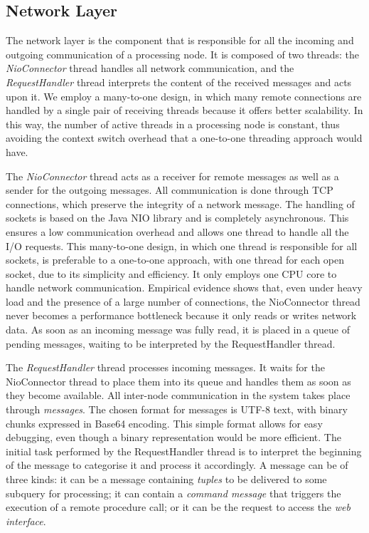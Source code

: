 \subsection*{Network Layer}  
The network layer is the component that is responsible for all the incoming and outgoing communication
of a processing node. 
It is composed of two threads: the \emph{NioConnector} thread handles all
network communication, and the \emph{RequestHandler} thread interprets the content of the received
messages and acts upon it.
We employ a many-to-one design, in which many remote connections are handled by a single pair
of receiving threads because it offers better scalability. In this way, the
number of active threads in a processing node is constant, thus avoiding the context switch overhead that
a one-to-one threading approach would have.

The \emph{NioConnector} thread acts as a receiver for remote messages as well as a sender for the
outgoing messages. All communication is done through TCP connections, which preserve the integrity of a
network message.
The handling of sockets is based on the Java NIO library and is completely asynchronous. This ensures a
low communication overhead and allows one thread to handle all the I/O requests. This many-to-one
design, in which one thread is responsible for all sockets, is preferable to a one-to-one approach,
with one thread for each open socket, due to its simplicity and efficiency. It only employs one CPU
core to handle network communication. Empirical evidence shows that, even under heavy load and the
presence of a large number of connections, the NioConnector thread never becomes a performance
bottleneck because it only reads or writes network data.
As soon as an incoming message was fully read, it is placed in a queue of pending messages, waiting
to be interpreted by the RequestHandler thread.

The \emph{RequestHandler} thread processes incoming messages. It waits for the
NioConnector thread to place them into its queue and handles them as soon as they become available. All
inter-node communication in the system takes place through \emph{messages}. 
The chosen format for messages is UTF-8 text, with
binary chunks expressed in Base64 encoding. This simple format allows
for easy debugging, even though a binary representation would be more efficient.
The initial task performed by the RequestHandler thread is to interpret the beginning of the message to
categorise it and process it accordingly. A message can be of three kinds: it can be a message
containing \emph{tuples} to be delivered to some subquery for processing; it can contain a \emph{command
message} that triggers the execution of a remote procedure call; or it can be the request to
access the \emph{web interface}.
\vspace{-10pt}
